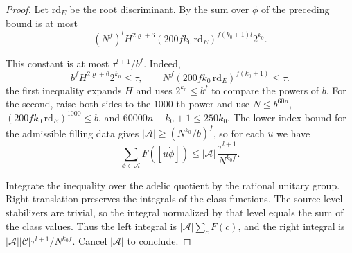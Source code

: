 \begin{proof}
Let $\mathrm{rd}_E$ be the root discriminant. By  the sum over $\phi$ of the preceding bound is at most
\[
 (N^f)^l H^{2\varrho+6}
     (200 f k_0\,\mathrm{rd}_E)^{f(k_0+1)l} 2^{k_0}.
\]

This constant is at most $\tau^{l+1}/b^f$. Indeed,
\[
 b^f H^{2\varrho+6}2^{k_0}\le \tau,
 \qquad
 N^f(200 f k_0\,\mathrm{rd}_E)^{f(k_0+1)}\le\tau.
\]
the first inequality expands $H$ and uses $2^{k_0}\le b^f$ to compare the powers of $b$.
For the second, raise both sides to the $1000$-th power and use
$N\le b^{60n}$, $(200 f k_0\,\mathrm{rd}_E)^{1000}\le b$, and
$60000n+k_0+1\le250k_0$.
The lower index bound for the admissible filling data gives $|\mathcal A|\ge(N^{k_0}/b)^f$,
so for each $u$ we have
\[
 \sum_{\phi\in\mathcal A}F([u\dot\phi])
 \le |\mathcal A|\,\frac{\tau^{l+1}}{N^{k_0f}}.
\]

Integrate the inequality over the adelic quotient by the rational unitary group.
Right translation preserves the integrals of the class functions. The source-level stabilizers are trivial, so the integral normalized by that level equals the sum of the class values.
Thus the left integral is $|\mathcal A|\sum_c F(c)$,
and the right integral is $|\mathcal A||\mathcal C|\tau^{l+1}/N^{k_0f}$.
Cancel $|\mathcal A|$ to conclude.
\end{proof}

